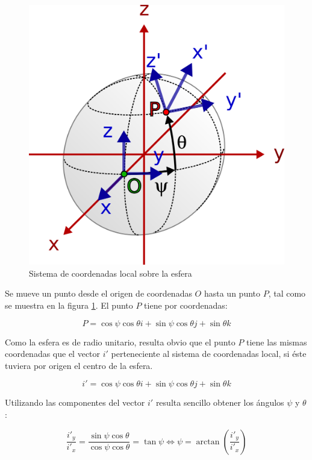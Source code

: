 \documentclass[10pt, a4paper]{report}
\begin{document}
\begin{figure}[h]
	\centering
		\includegraphics[scale=0.85]{../img/sphere.png} 
	\caption{Sistema de coordenadas local sobre la esfera}
	\label{fig: esfera_coordenadas}
\end{figure}

Se mueve un punto desde el origen de coordenadas $O$ hasta un punto $P$, tal como se muestra en la figura \ref{fig: esfera_coordenadas}. El punto $P$ tiene por coordenadas:

$$ P = \cos \psi \cos \theta i + \sin \psi \cos \theta j + \sin \theta k$$

Como la esfera es de radio unitario, resulta obvio que el punto $P$ tiene las mismas coordenadas que el vector $i'$ perteneciente al sistema de coordenadas local, si éste tuviera por origen el centro de la esfera.

\begin{equation} \label{eq: E13}
i' = \cos \psi \cos \theta i + \sin \psi \cos \theta j + \sin \theta k
\end{equation}

Utilizando las componentes del vector $i'$ resulta sencillo obtener los ángulos $\psi$ y $\theta$:

\begin{equation}
\frac{i'_y}{i'_x} =  \frac{\sin \psi \cos \theta}{\cos \psi \cos \theta} = \tan{\psi} \iff \psi = \arctan \left( \frac{i'_y}{i'_x} \right)
\end{equation}
\end{document}
